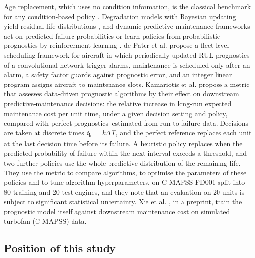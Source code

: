 \documentclass[a4paper,fleqn,doubleblind]{cas-dc}
\begin{document}
Age replacement, which uses no condition information, is the classical benchmark for any condition-based policy \cite{barlow1960,dejonge2020}. Degradation models with Bayesian updating yield residual-life distributions \cite{gebraeel2005}, and dynamic predictive-maintenance frameworks act on predicted failure probabilities \cite{nguyen2019,mitici2023} or learn policies from probabilistic prognostics by reinforcement learning \cite{lee2023}. de Pater et al. \cite{depater2022} propose a fleet-level scheduling framework for aircraft in which periodically updated RUL prognostics of a convolutional network trigger alarms, maintenance is scheduled only after an alarm, a safety factor guards against prognostic error, and an integer linear program assigns aircraft to maintenance slots. Kamariotis et al. \cite{kamariotis2024} propose a metric that assesses data-driven prognostic algorithms by their effect on downstream predictive-maintenance decisions: the relative increase in long-run expected maintenance cost per unit time, under a given decision setting and policy, compared with perfect prognostics, estimated from run-to-failure data. Decisions are taken at discrete times \textit{t}\textsubscript{k} = \textit{k}$\Delta$\textit{T}, and the perfect reference replaces each unit at the last decision time before its failure. A heuristic policy replaces when the predicted probability of failure within the next interval exceeds a threshold, and two further policies use the whole predictive distribution of the remaining life. They use the metric to compare algorithms, to optimise the parameters of these policies and to tune algorithm hyperparameters, on C-MAPSS FD001 split into 80 training and 20 test engines, and they note that an evaluation on 20 units is subject to significant statistical uncertainty. Xie et al. \cite{xie2025}, in a preprint, train the prognostic model itself against downstream maintenance cost on simulated turbofan (C-MAPSS) data.

\subsection{Position of this study}
\end{document}
